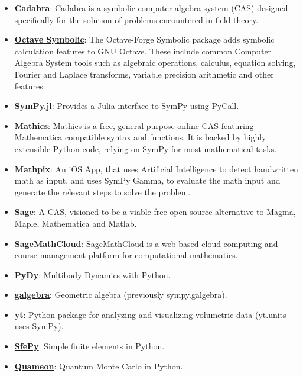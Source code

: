\begin{itemize}
\begin{itemize}
\item
  \href{http://cadabra.science/index.html}{\textbf{Cadabra}}: Cadabra is
  a symbolic computer algebra system (CAS) designed specifically for the
  solution of problems encountered in field theory.
\item
  \href{http://octave.sourceforge.net/symbolic/}{\textbf{Octave Symbolic}}:
  The Octave-Forge Symbolic package adds symbolic calculation features
  to GNU Octave. These include common Computer Algebra System tools such
  as algebraic operations, calculus, equation solving, Fourier and
  Laplace transforms, variable precision arithmetic and other features.
\item
  \href{https://github.com/jverzani/SymPy.jl}{\textbf{SymPy.jl}}:
  Provides a Julia interface to SymPy using PyCall.
\item
  \href{https://mathics.github.io/}{\textbf{Mathics}}: Mathics is a
  free, general-purpose online CAS featuring Mathematica compatible
  syntax and functions. It is backed by highly extensible Python code,
  relying on SymPy for most mathematical tasks.
\item
  \href{http://mathpix.com/}{\textbf{Mathpix}}: An iOS App, that uses
  Artificial Intelligence to detect handwritten math as input, and uses
  SymPy Gamma, to evaluate the math input and generate the relevant
  steps to solve the problem.
\item
  \href{http://www.sagemath.org/}{\textbf{Sage}}: A CAS, visioned to be
  a viable free open source alternative to Magma, Maple, Mathematica and
  Matlab.
\item
  \href{https://cloud.sagemath.com}{\textbf{SageMathCloud}}:
  SageMathCloud is a web-based cloud computing and course management
  platform for computational mathematics.
\item
  \href{http://www.pydy.org/}{\textbf{PyDy}}: Multibody Dynamics with
  Python.
\item
  \href{https://github.com/brombo/galgebra}{\textbf{galgebra}}:
  Geometric algebra (previously sympy.galgebra).
\item
  \href{http://yt-project.org/}{\textbf{yt}}: Python package for
  analyzing and visualizing volumetric data (yt.units uses SymPy).
\item
  \href{http://sfepy.org/}{\textbf{SfePy}}: Simple finite elements in
  Python.
\item
  \href{http://quameon.sourceforge.net/}{\textbf{Quameon}}: Quantum
  Monte Carlo in Python.

\end{itemize}
\end{itemize}

